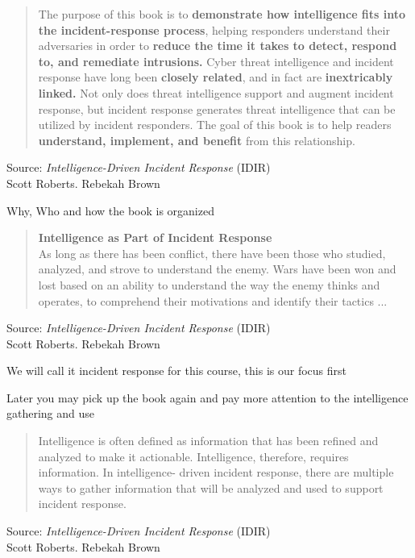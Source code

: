 \documentclass[Screen16to9,17pt]{foils}
\begin{document}
\begin{quote}
The purpose of this book is to {\bf demonstrate how intelligence fits into the incident-response process}, helping responders understand their adversaries in order to {\bf reduce the time it takes to detect, respond to, and remediate intrusions.} Cyber threat intelligence and incident response have long been {\bf closely related}, and in fact are {\bf inextricably linked.} Not only does threat intelligence support and augment incident response, but incident response generates threat intelligence that can be utilized by incident responders. The goal of this book is to help readers {\bf understand, implement, and benefit} from this relationship.
\end{quote}
Source: \emph{Intelligence-Driven Incident Response} (IDIR)\\
 Scott Roberts. Rebekah Brown

\begin{list2}
\item Why, Who and how the book is organized
\end{list2}



\begin{quote}
{\large\bf Intelligence as Part of Incident Response}\\
As long as there has been conflict, there have been those who studied, analyzed, and
strove to understand the enemy. Wars have been won and lost based on an ability to
understand the way the enemy thinks and operates, to comprehend their motivations
and identify their tactics ...
\end{quote}
Source: \emph{Intelligence-Driven Incident Response} (IDIR)\\
 Scott Roberts. Rebekah Brown

\begin{list2}
\item We will call it incident response for this course, this is our focus first
\item Later you may pick up the book again and pay more attention to the intelligence gathering and use
\end{list2}



\begin{quote}
Intelligence is often defined as information that has been refined and analyzed to
make it actionable. Intelligence, therefore, requires information. In intelligence-
driven incident response, there are multiple ways to gather information that will be
analyzed and used to support incident response.
\end{quote}
Source: \emph{Intelligence-Driven Incident Response} (IDIR)\\
 Scott Roberts. Rebekah Brown
\end{document}
